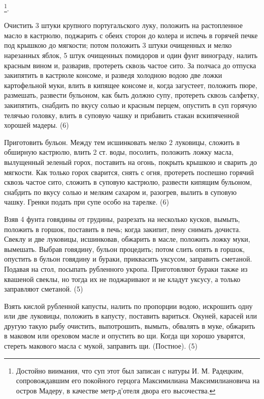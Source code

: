 \footnote{Достойно виимания, что суп этот был записан с натуры И. М. Радецким, сопровождавшим его покойного герцога Максимилиана Максимилиановича на остров Мадеру, в качестве метр-д'отеля двора его высочества.}.

Очистить 3 штуки крупного португальского луку, положить на растопленное масло в кастрюлю, поджарить с обеих сторон до колера и испечь в горячей печке под крышкою до мягкости; потом положить 3 штуки очищенных и мелко нарезанных яблок, 5 штук очищенных помидоров и один фунт винограду, налить красным вином и, разварив, протереть сквозь частое сито. За полчаса до отпуска закипятить в кастрюле консоме, и разведя холодною водою две ложки картофельной муки, влить в кипящее консоме и, когда загустеет, положить пюре, размешать, развести бульоном, как быть должно супу, протереть сквозь салфетку, закипятить, снабдить по вкусу солью и красным перцем, опустить в суп горячую телячью головку, влить в суповую чашку и прибавить стакан вскипяченной хорошей мадеры. (6)


Приготовить бульон. Между тем исшинковать мелко 2 луковицы, сложить в обширную кастрюлю, влить 2 ст. воды, посолить, положить ложку масла, вылущенный зеленый горох, поставить на огонь, покрыть крышкою и сварить до мягкости. Как только горох сварится, снять с огня, протереть поспешно горячий сквозь частое сито, сложить в суповую кастрюлю, развести кипящим бульоном, снабдить по вкусу солью и мелким сахаром и, разогрев, вылить в суповую чашку. Гренки подать при супе особо на тарелке. (6)


Взяв 4 фунта говядины от грудины, разрезать на несколько кусков, вымыть, положить в горшок, поставить в печь; когда закипит, пену снимать дочиста. Свеклу и две луковицы, исшинковав, обжарить в масле, положить ложку муки, вымешать. Выбрав говядину, бульон процедить; потом слить опять в горшок, опустить в бульон говядину и бураки, приквасить уксусом, заправить сметаной. Подавая на стол, посыпать рубленного укропа. Приготовляют бураки также из квашеной свеклы, но тогда их не поджаривают и не кладут уксусу, а только заправляют сметаной. (5)


Взять кислой рубленной капусты, налить по пропорции водою, искрошить одну или две луковицы, положить в капусту, поставить вариться. Окуней, карасей или другую такую рыбу очистить, выпотрошить, вымыть, обвалять в муке, обжарить в маковом или ореховом масле и опустить во щи. Когда щи хорошо уварятся, стереть макового масла с мукой, заправить щи. (Постное). (5)

